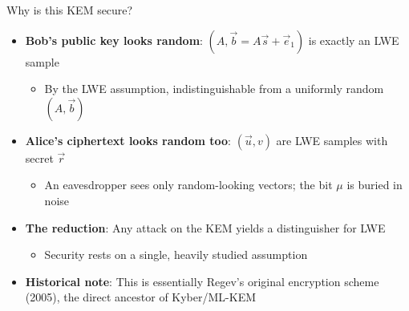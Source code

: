 \ifdefined\PRESENTATION\else\PassOptionsToClass{handout}{beamer}\fi\documentclass[aspectratio=169, lualatex]{beamer}
\begin{document}
\begin{frame}{Why is this KEM secure?}
	\begin{itemize}
		\item \textbf{Bob's public key looks random}: $(A, \vec{b} = A\vec{s} + \vec{e}_1)$ is exactly an LWE sample
		      \begin{itemize}
			      \item By the LWE assumption, indistinguishable from a uniformly random $(A, \vec{b})$
		      \end{itemize}
		\item \textbf{Alice's ciphertext looks random too}: $(\vec{u}, v)$ are LWE samples with secret $\vec{r}$
		      \begin{itemize}
			      \item An eavesdropper sees only random-looking vectors; the bit $\mu$ is buried in noise
		      \end{itemize}
		\item \textbf{The reduction}: Any attack on the KEM yields a distinguisher for LWE
		      \begin{itemize}
			      \item Security rests on a single, heavily studied assumption
		      \end{itemize}
		\item \textbf{Historical note}: This is essentially Regev's original encryption scheme (2005), the direct ancestor of Kyber/ML-KEM
	\end{itemize}
\end{frame}
\end{document}
